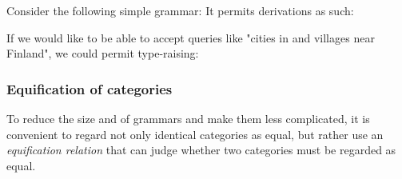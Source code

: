 \documentclass[main.tex]{subfiles}
\begin{document}
\begin{example}
    Consider the following simple grammar:
    It permits derivations as such:

    If we would like to be able to accept queries like "cities in and villages
    near Finland", we could permit type-raising:

\end{example}

\subsubsection{Equification of categories}
\label{hack:equification}
To reduce the size and of grammars and make them less complicated, 
it is convenient to regard
not only identical categories as equal, but rather use an \emph{equification
relation} that can judge whether two categories must be regarded as equal.
\end{document}
